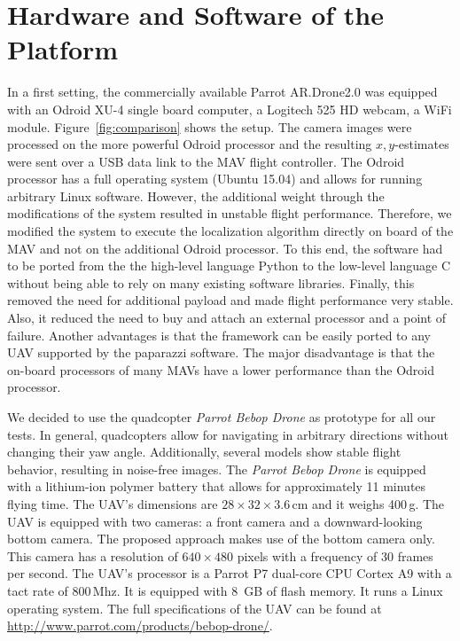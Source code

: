 \section{Hardware and Software of the Platform}
\label{sec:hardware}

In a first setting, the commercially available Parrot AR.Drone2.0 was
equipped with an Odroid XU-4 single board computer, a Logitech 525 HD
webcam, a WiFi module. Figure~\ref{fig:comparison} shows the setup. The camera images were processed on the more powerful Odroid processor and the resulting $x,y$-estimates were sent over a USB data link to the MAV flight controller. The Odroid processor has a full operating system (Ubuntu 15.04) and
allows for running arbitrary Linux software.
However, the additional weight through the modifications of the system resulted in unstable flight performance. Therefore, we modified the system to execute the localization algorithm directly on board of the MAV and not on the additional Odroid processor. To this end, the software had to be ported from the the high-level language
Python to the low-level language C without being able to rely on many
existing software libraries.
Finally, this removed the need for additional payload and made flight performance
very stable. Also, it reduced the need to buy and attach an external
processor and a point of failure. Another advantages is that the
framework can be easily ported to any UAV supported by the paparazzi
software. The major disadvantage is that the on-board processors of many
MAVs have a lower performance than the Odroid processor.

We decided to use the quadcopter \emph{Parrot Bebop Drone}
as prototype for all our tests. In general, quadcopters allow for navigating in
arbitrary directions without changing their yaw angle. Additionally,
several models show stable flight behavior, resulting in noise-free
images. The \emph{Parrot Bebop Drone} is equipped with a lithium-ion polymer battery that allows for approximately 11 minutes flying time. The UAV's dimensions are $28 \times 32 \times 3.6$\,cm
and it weighs 400\,g. The UAV is equipped with two cameras: a front camera and a
downward-looking bottom camera. The proposed approach makes use of the
bottom camera only. This camera has a resolution of $640 \times 480$
pixels with a frequency of 30 frames per second. The UAV's processor
is a Parrot P7 dual-core CPU Cortex A9 with a tact rate of
800\,Mhz. It is equipped with 8~GB of flash memory. It runs a Linux
operating system. The full specifications of the UAV can be found at
\url{http://www.parrot.com/products/bebop-drone/}.


